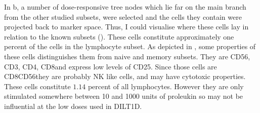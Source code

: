 In b, a number of dose-responsive tree nodes which lie far on the main branch from the other studied subsets, were selected and the cells they contain were projected back to marker space.
Thus, I could visualise where these cells lay in relation to the known subsets ().
These cells constitute approximately one percent of the cells in the lymphocyte subset.
As depicted in , some properties of these cells distinguishes them from naive and memory subsets.
They are CD56\high, CD3\negative, CD4\negative, CD8\positive and express low levels of CD25.
Since those cells are CD8\positive CD56\positive they are probably \gls{NK} like cells, and may have cytotoxic properties.
These cells constitute $1.14$ percent of all lymphocytes.
However they are only stimulated somewhere between 10 and 1000 units of proleukin so may not be influential at the low doses used in DILT1D.

